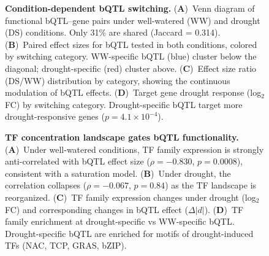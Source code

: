 \documentclass[10pt,letterpaper]{article}
\begin{document}
\begin{figure}[h!]
\centering
\caption{\textbf{Condition-dependent bQTL switching.}
(\textbf{A})~Venn diagram of functional bQTL--gene pairs under well-watered (WW)
and drought (DS) conditions. Only 31\% are shared (Jaccard = 0.314).
(\textbf{B})~Paired effect sizes for bQTL tested in both conditions, colored by
switching category. WW-specific bQTL (blue) cluster below the diagonal;
drought-specific (red) cluster above.
(\textbf{C})~Effect size ratio (DS/WW) distribution by category, showing the
continuous modulation of bQTL effects.
(\textbf{D})~Target gene drought response (log$_2$FC) by switching category.
Drought-specific bQTL target more drought-responsive genes ($p = 4.1 \times 10^{-4}$).}
\label{fig:switching}
\end{figure}

\begin{figure}[h!]
\centering
\caption{\textbf{TF concentration landscape gates bQTL functionality.}
(\textbf{A})~Under well-watered conditions, TF family expression is strongly
anti-correlated with bQTL effect size ($\rho = -0.830$, $p = 0.0008$),
consistent with a saturation model.
(\textbf{B})~Under drought, the correlation collapses ($\rho = -0.067$,
$p = 0.84$) as the TF landscape is reorganized.
(\textbf{C})~TF family expression changes under drought (log$_2$FC) and
corresponding changes in bQTL effect ($\Delta|d|$).
(\textbf{D})~TF family enrichment at drought-specific vs WW-specific bQTL.
Drought-specific bQTL are enriched for motifs of drought-induced TFs
(NAC, TCP, GRAS, bZIP).}
\label{fig:saturation}
\end{figure}
\end{document}
